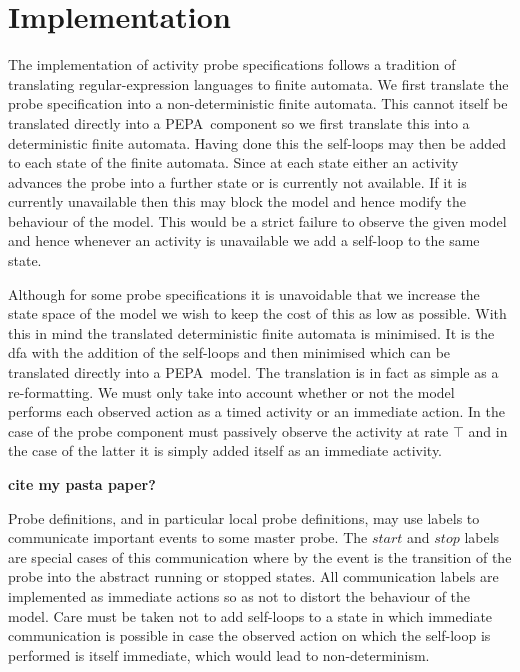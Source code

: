 \documentclass[times, 10pt,twocolumn]{article}
\newcommand{\adcComment}[1]{\textbf{#1}}
\newcommand{\pepa}{\textrm{PEPA}}
\newcommand{\quoteActivity}[1]{$#1$}
\begin{document}
% 


\section{Implementation}

The implementation of activity probe specifications follows a tradition
of translating regular-expression languages to finite automata.
We first translate the probe specification into a non-deterministic
finite automata. This cannot itself be translated directly into a
\pepa\ component so we first translate this into a deterministic
finite automata. Having done this the self-loops may then be added to
each state of the finite automata. Since at each state either an activity
advances the probe into a further state or is currently not available.
If it is currently unavailable then this may block the model and hence
modify the behaviour of the model. This would be a strict failure to observe
the given model and hence whenever an activity is unavailable we add a self-loop
to the same state.

Although for some probe specifications it is unavoidable that we increase the
state space of the model we wish to keep the cost of this as low as possible.
With this in mind the translated deterministic finite automata is minimised.
It is the dfa with the addition of the self-loops and then minimised which
can be translated directly into a \pepa\ model.
The translation is in fact as simple as a re-formatting. We must only take
into account whether or not the model performs each observed action as
a timed activity or an immediate action. In the case of the probe component
must passively observe the activity at rate $\top$ and in the case of the latter
it is simply added itself as an immediate activity.

\adcComment{cite my pasta paper?}

Probe definitions, and in particular local probe definitions, may use
labels to communicate important events to some master probe.
The \quoteActivity{start} and \quoteActivity{stop} labels are special
cases of this communication where by the event is the transition of the probe
into the abstract running or stopped states. All communication labels are
implemented as immediate actions so as not to distort the behaviour of the
model. Care must be taken not to add self-loops to a state in which immediate
communication is possible in case the observed action on which the self-loop is
performed is itself immediate, which would lead to non-determinism.
\end{document}
